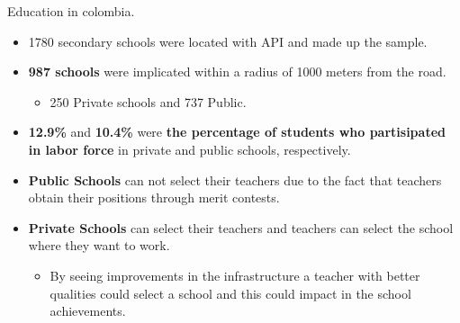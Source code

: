 \documentclass[9pt]{beamer}
\begin{document}
\begin{frame}{ Education in colombia. \hyperlink{data}{}} \label{education}

\justifying 
\begin{itemize}

    \item 1780 secondary schools were located with API and made up the sample.
    \item \textbf{987 schools} were implicated within a radius of 1000 meters from the road.
    \begin{itemize}
            \item 250 Private schools and 737 Public.
    \end{itemize}
    \item \textbf{12.9\%} and \textbf{10.4\%} were  \textbf{the percentage of students who partisipated in labor force} in private and public schools, respectively.
        
    \item \textbf{Public Schools} can not select their teachers due to the fact that teachers obtain their positions through merit contests.
     \item \textbf{Private Schools} can select their teachers and teachers can select the school where they want to work.
    \begin{itemize}
        \item By seeing improvements in the infrastructure a teacher with better qualities could select a school and this could impact in the school achievements.
    \end{itemize}
\end{itemize}
   \end{frame}     
   
\end{document}
